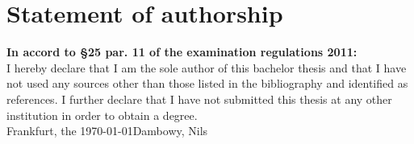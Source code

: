 \newpage

\thispagestyle{empty}
\section*{Statement of authorship}
\thispagestyle{empty}
\textbf{In accord to §25 par. 11 of the examination regulations 2011:}\\
I hereby declare that I am the sole author of this bachelor thesis and that I have not used any sources other than those listed in the bibliography and identified as references. I further declare that I have not submitted 
this thesis at any other institution in order to obtain a degree.
\vspace{4\baselineskip}\\
Frankfurt, the \today \hfill Dambowy, Nils
\vspace{4\baselineskip}\\
